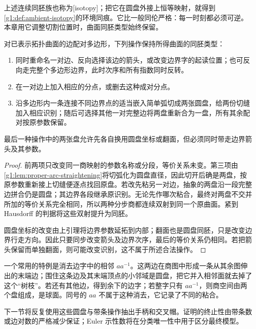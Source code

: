 上述连续同胚族也称为[isotopy]；把它在圆盘外接上恒等映射，就得到\cref{g1:def:ambient-isotopy}的环境同痕。它比一般同伦严格：每一时刻都必须可逆。本章用它调整切割位置时，曲面同胚类型始终保留。

\begin{proposition}\label{g1:prop:polygon-moves}
	对已表示拓扑曲面的边配对多边形，下列操作保持所得曲面的同胚类型：
	\begin{enumerate}
		\item 同时重命名一对边、反向选择该边的箭头，或改变边界字的起读位置；也可反向走完整个多边形边界，此时次序和所有指数同时反转。
		\item 在一对边上加入相应的分点，或删去这种成对分点。
		\item 沿多边形内一条连接不同边界点的适当嵌入简单弧切成两张圆盘，给两份切缝加入相应识别；随后可选择其他一对完整边将两盘重新合为一盘，所有其余配对按原参数保留。
	\end{enumerate}
	最后一种操作中的两张盘允许先各自换用圆盘坐标或翻面，但必须同时带走边界箭头及其参数。
\end{proposition}
\begin{proof}
	前两项只改变同一商映射的参数名称或分段，等价关系未变。第三项由\cref{g1:lem:proper-arc-straightening}将切弧化为圆盘直径，因此切开后确是两盘，按原参数重新接上切缝便逐点找回原盘。若改先粘另一对边，抽象的两盘沿一段完整边拼合仍是圆盘；其边界各段继承原识别。无论先作哪次粘合，最终对两盘不交并所加的等价关系完全相同，所以两种分步商都连续双射到同一个原曲面。紧到 Hausdorff 的判据将这些双射提升为同胚。

	圆盘坐标的改变由上引理将边界参数延拓到内部；翻面也是圆盘同胚，只是改变边界行走方向。因此只要同步改变箭头及边界次序，最后的等价关系仍相同。若把箭头保留而单独翻面，则可能改变识别，这不属于所述合法操作。
\end{proof}

一个常用的特例是消去边字中的相邻 \(aa^{-1}\)。这两边在商图中形成一条从其余图伸出的末端边；围住这条边及其末端顶点的小邻域是圆盘，把它并入相邻面就去掉了这个“树枝”。若还有其他边，得到余下的边字；若整字只有 \(aa^{-1}\)，则商空间由两个盘组成，是球面。同号的 \(aa\) 不属于这种消去，它记录了不同的粘合。

\ProseParagraphBreak

下一节将反复使用这些圆盘与带条操作抽出手柄和交叉帽。证明的终止性由带条数或边对数的严格减少保证；Euler 示性数将在分类唯一性中用于区分最终模型。
